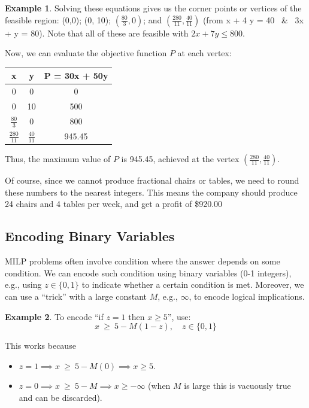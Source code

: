 \documentclass[oneside,11pt,dvipsnames]{book}
\numberwithin{equation}{section}
\theoremstyle{definition}
\newtheorem{example}{Example}[section]
\theoremstyle{remark}
\begin{document}
\begin{example}
Solving these equations gives us the corner points or vertices of the feasible region:
(0,0);
(0, 10);
$(\frac{80}{3} ,0)$; and
$(\frac{280}{11},\frac{40}{11})$ (from x + 4 y = 40 ~\&~ 3x + y = 80).
Note that all of these are feasible with $2x + 7y \le 800$.




Now, we can evaluate the objective function $P$ at each vertex:

\begin{center}
\begin{tabular}{ccc}
\hline
x & y & P = 30x + 50y \\
\hline
0 & 0 & 0 \\
0 & 10 & 500 \\
$\frac{80}{3}$ & 0 & 800 \\
$\frac{280}{11}$ & $\frac{40}{11}$ &945.45 \\
\hline
\end{tabular}
\end{center}

Thus, the maximum value of $P$ is 945.45, achieved at the vertex $(\frac{280}{11},\frac{40}{11})$.

Of course, since we cannot produce fractional chairs or tables, we need to round these numbers to the nearest integers.
This means the company should produce 24 chairs and 4 tables per week, and get a profit of \$920.00

\end{example}


\subsection{Encoding Binary Variables}\label{sec:milp-binary}
MILP problems often involve condition where the answer depends on some condition.  We can encode such condition using binary variables (0-1 integers), e.g., using  $z \in \{0,1\}$ to indicate whether a certain condition is met.  Moreover, we can use a ``trick'' with a large constant $M$, e.g., $\infty$, to encode logical implications.

\begin{example}
To encode ``if $z = 1$ then $x \geq 5$'', use:
\[
x ~ \geq~ 5 - M(1-z), \quad z \in \{0,1\}
\]


This works because
\begin{itemize}
 \item $z=1 \implies x ~\ge~ 5 - M(0) \implies x \geq 5$.
 \item $z=0 \implies x ~\geq~ 5 - M \implies x \ge -\infty$ (when $M$ is large this is vacuously true and can be discarded).
\end{itemize}

\end{example}
\end{document}
